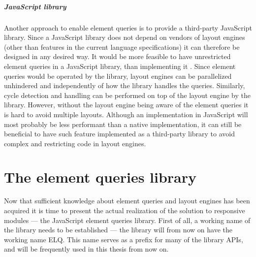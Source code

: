\documentclass[a4paper,11pt]{kth-mag}
\begin{document}
      \paragraph{JavaScript library}
      Another approach to enable element queries is to provide a \gls{third-party} \gls{JavaScript} library.
      Since a \gls{JavaScript} library does not depend on vendors of \glspl{layout engine} (other than features in the current language specifications) it can therefore be designed in any desired way.
      It would be more feasible to have unrestricted element queries in a \gls{JavaScript} library, than implementing it .
      Since element queries would be operated by the library, \glspl{layout engine} can be parallelized unhindered and independently of how the library handles the queries.
      Similarly, cycle detection and handling can be performed on top of the \gls{layout engine} by the library.
      However, without the \gls{layout engine} being aware of the element queries it is hard to avoid multiple layouts.
      Although an implementation in \gls{JavaScript} will most probably be less performant than a \gls{native} implementation, it can still be beneficial to have such feature implemented as a \gls{third-party} library to avoid complex and restricting code in \glspl{layout engine}.



  \chapter{The element queries library}\label{ch:library}
    Now that sufficient knowledge about element queries and \glspl{layout engine} has been acquired it is time to present the actual realization of the solution to \gls{responsive} modules --- the \gls{JavaScript} element queries library.
    First of all, a working name of the library needs to be established --- the library will from now on have the working name \gls{ELQ}.
    This name serves as a prefix for many of the library \glspl{API}, and will be frequently used in this thesis from now on.
    
\end{document}
